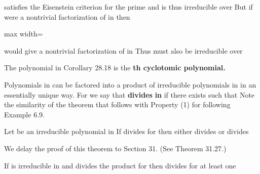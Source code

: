 \documentclass[11pt,oneside]{article}
\begin{document}
\begin{BookBody}
\noindent satisfies the Eisenstein criterion for the prime  and is thus irreducible over  But if  were a nontrivial factorization of  in  then

\begin{center}\begin{adjustbox}{max width=\linewidth}\end{adjustbox}\end{center}

\noindent would give a nontrivial factorization of  in  Thus  must also be irreducible over \BookEnd{\blacklozenge}

The polynomial  in Corollary 28.18 is the \textbf{th cyclotomic polynomial.}


\noindent Polynomials in  can be factored into a product of irreducible polynomials in  in an essentially unique way. For  we say that  \textbf{divides}  \textbf{in}  if there exists  such that  Note the similarity of the theorem that follows with Property (1) for  following Example 6.9.

 Let  be an irreducible polynomial in  If  divides  for   then either  divides  or  divides 

 We delay the proof of this theorem to Section 31. (See Theorem 31.27.) \BookEnd{\blacklozenge}

 If  is irreducible in  and  divides the product  for  then  divides  for at least one 


\end{BookBody}
\end{document}
